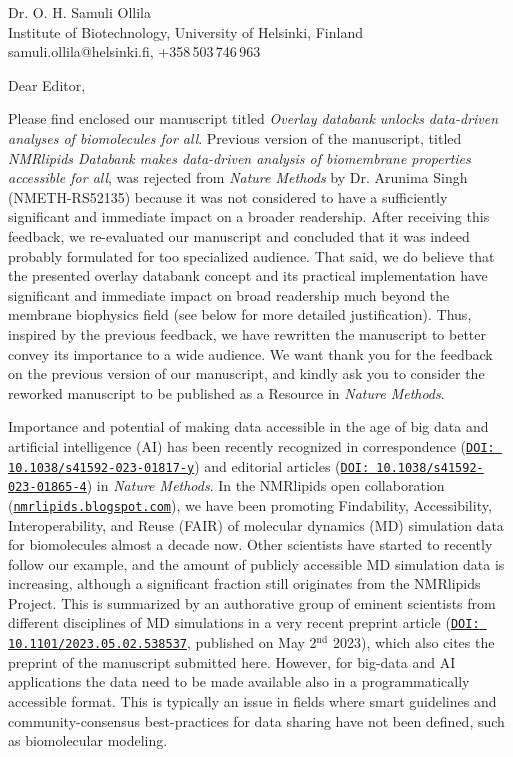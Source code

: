 \documentclass[11pt]{letter}
\begin{document}
\reversemarginpar
\pagestyle{empty}
\noindent Dr. O. H. Samuli Ollila \\
\noindent Institute of Biotechnology, University of Helsinki, Finland \\
\noindent samuli.ollila@helsinki.fi, +358\,503\,746\,963 


Dear Editor,

Please find enclosed our manuscript titled {\it Overlay databank unlocks data-driven analyses of biomolecules for all}. Previous version of the manuscript, titled {\it NMRlipids Databank makes data-driven analysis of biomembrane properties accessible for all}, was rejected from \textit{Nature Methods} by Dr. Arunima Singh (NMETH-RS52135) because it was not considered to have a sufficiently significant and immediate impact on a broader readership. After receiving this feedback, we re-evaluated our manuscript and concluded that it was indeed probably formulated for too specialized audience. That said, we do believe that the presented overlay databank concept and its practical implementation have significant and immediate impact on broad readership much beyond the membrane biophysics field (see below for more detailed justification). Thus, inspired by the previous feedback, we have rewritten the manuscript to better convey its importance to a wide audience. We want thank you for the feedback on the previous version of our manuscript, and kindly ask you to consider the reworked manuscript to be published as a Resource in \textit{Nature Methods}. 

Importance and potential of making data accessible in the age of big data and artificial intelligence (AI) has been recently recognized in correspondence (\href{https://doi.org/10.1038/s41592-023-01817-y}{\tt DOI: 10.1038/s41592-023-01817-y}) and editorial articles (\href{https://doi.org/10.1038/s41592-023-01865-4}{\tt DOI: 10.1038/s41592-023-01865-4}) in \textit{Nature Methods}. In the NMRlipids open collaboration (\href{http://nmrlipids.blogspot.com/}{\tt nmrlipids.blogspot.com}), we have been promoting Findability, Accessibility, Interoperability, and Reuse (FAIR) of molecular dynamics (MD) simulation data for biomolecules almost a decade now. Other scientists have started to recently follow our example, and the amount of publicly accessible MD simulation data is increasing, although a significant fraction still originates from the NMRlipids Project. This is summarized by an authorative group of eminent scientists from different disciplines of MD simulations in a very recent preprint article (\href{http://dx.doi.org/10.1101/2023.05.02.538537}{\tt DOI: 10.1101/2023.05.02.538537}, published on May 2$^\mathrm{nd}$ 2023), which also %
cites the preprint of the manuscript submitted here. However, for big-data and AI applications the data need to be made available also in a programmatically accessible format. This is typically an issue in fields where smart guidelines and community-consensus best-practices for data sharing have not been defined, such as biomolecular modeling.
\end{document}
